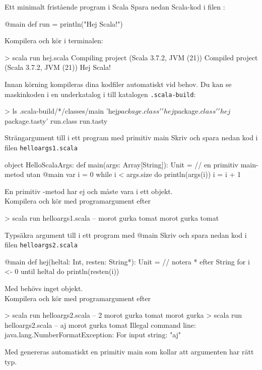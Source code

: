 \begin{Slide}{Ett minimalt fristående program i Scala}\SlideFontSmall
Spara nedan Scala-kod i filen :
\begin{Code}
@main def run = println("Hej Scala!")
\end{Code}

Kompilera och kör i terminalen:
\begin{REPL}
> scala run hej.scala 
Compiling project (Scala 3.7.2, JVM (21))
Compiled project (Scala 3.7.2, JVM (21))
Hej Scala! 
\end{REPL}

Innan körning kompileras dina kodfiler automatiskt vid behov. Du kan se maskinkoden i en underkatalog i till katalogen \texttt{.scala-build}: 
\begin{REPL}
> ls .scala-build/*/classes/main
'hej$package.class'  'hej$package$.class'  'hej$package.tasty'   run.class   run.tasty
\end{REPL}
\end{Slide}



\begin{Slide}{Strängargument till i ett program med primitiv main}
Skriv och spara nedan kod i filen \texttt{helloargs1.scala}
\begin{Code}
object HelloScalaArgs:
  def main(args: Array[String]): Unit = // en primitiv main-metod utan @main
    var i = 0
    while i < args.size do
      println(args(i))
      i = i + 1
\end{Code}
En primitiv -metod har ej  och måste vara i ett objekt. \\
Kompilera och kör med programargument efter \code{--}
\begin{REPL}
> scala run helloargs1.scala -- morot gurka tomat
morot
gurka
tomat
\end{REPL}
\end{Slide}

\begin{Slide}{Typsäkra argument till i ett program med @main}
  \SlideFontSmall
Skriv och spara nedan kod i filen \texttt{helloargs2.scala}
\begin{Code}
@main def hej(heltal: Int, resten: String*): Unit =  // notera * efter String
  for i <- 0 until heltal do println(resten(i))
\end{Code}
Med  behövs inget objekt.\\
Kompilera och kör med programargument efter \code{--}
\begin{REPL}
> scala run helloargs2.scala -- 2 morot gurka tomat
morot
gurka
> scala run helloargs2.scala -- aj morot gurka tomat
Illegal command line: java.lang.NumberFormatException: For input string: "aj"
\end{REPL}
Med  genereras automatiskt en primitiv main som kollar att argumenten har rätt typ.
\end{Slide}


